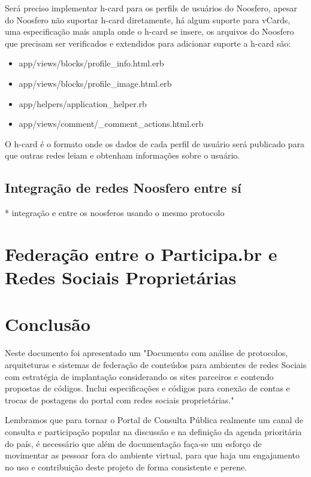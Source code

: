 \documentclass[12pt]{article}
\newcommand{\ProductDescription}{"Documento com análise de protocolos,
  arquiteturas e sistemas de federação de conteúdos para ambientes de redes
  Sociais com estratégia de implantação considerando os sites parceiros e
  contendo propostas de códigos. Inclui especificações e códigos para conexão
  de contas e trocas de postagens do portal com redes sociais proprietárias."
}
\begin{document}
Será preciso implementar h-card para os perfils de usuários do Noosfero,
apesar do Noosfero não suportar h-card diretamente, há algum suporte para
vCards, uma especificação mais ampla onde o h-card se insere, os arquivos do
Noosfero que precisam ser verificados e extendidos para adicionar suporte a
h-card são:

\begin{itemize}
  \item app/views/blocks/profile\_info.html.erb
  \item app/views/blocks/profile\_image.html.erb
  \item app/helpers/application\_helper.rb
  \item app/views/comment/\_comment\_actions.html.erb
\end{itemize}

O h-card é o formato onde os dados de cada perfil de usuário será publicado
para que outras redes leiam e obtenham informações sobre o usuário.

\subsection{Integração de redes Noosfero entre sí}

 * integração e entre os noosferos usando o mesmo protocolo

\section{Federação entre o Participa.br e Redes Sociais Proprietárias}


\section{Conclusão}

Neste documento foi apresentado um \ProductDescription

%
%

Lembramos que para tornar o Portal de Consulta Pública realmente um canal de
consulta e participação popular na discussão e na definição da agenda
prioritária do país, é necessário que além de documentação faça-se um esforço
de movimentar as pessoar fora do ambiente virtual, para que haja um
engajamento no uso e contribuição deste projeto de forma consistente e perene.

\newpage

\newpage
\listoffigures
\newpage
\printindex
\newpage

\newpage
\appendix
\appendixpage

\end{document}
